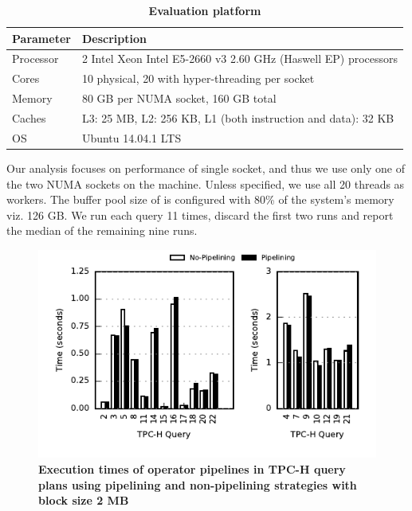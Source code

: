 \begin{table}[h]
	\centering
	\begin{tabular}{|l|l|}
		\hline
		\textbf{Parameter} & \textbf{Description} \\ \hline
		Processor & 2 Intel Xeon Intel E5-2660 v3 2.60 GHz (Haswell EP) processors\\ \hline
		Cores & 10 physical, 20 with hyper-threading per socket \\ \hline
		Memory & 80 GB per NUMA socket, 160 GB total \\ \hline
		Caches & L3: 25 MB, L2: 256 KB, L1 (both instruction and data): 32 KB \\ \hline
		OS & Ubuntu 14.04.1 LTS \\ \hline
	\end{tabular}
	\caption{\textbf{Evaluation platform}}
	\label{table:hardware-pipeline}
\end{table}

Our analysis focuses on performance of single socket, and thus we use only one of the two NUMA sockets on the machine.
Unless specified, we use all 20 threads as \sys{} workers.
The buffer pool size of \sys{} is configured with 80\% of the system's memory viz. 126 GB.
We run each query 11 times, discard the first two runs and report the median of the remaining nine runs. 



\begin{figure}[ht]
	\centering 
	\includegraphics{pipeline/figures/deep-pipeline-comparison-2mb-withlip}
	\caption{\textbf{Execution times of operator pipelines in TPC-H query plans using pipelining and non-pipelining strategies with block size 2 MB}}
	\label{fig:deep-pipeline-comparison-2mb}
\end{figure}

